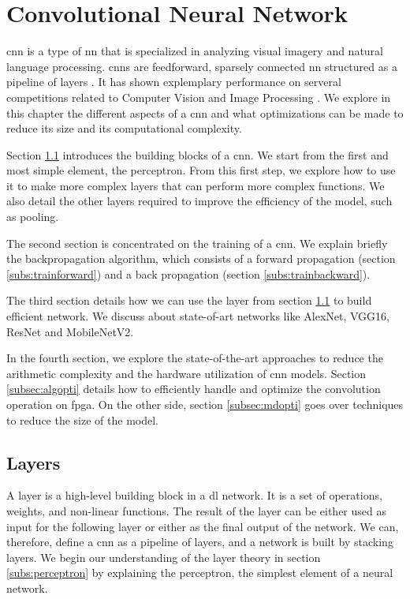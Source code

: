 \chapter{Convolutional Neural Network} \label{chap:cnn}
\acrfull{cnn} is a type of \acrlong{nn} that is specialized in analyzing visual imagery and natural language processing. \acrshort{cnn}s are feedforward, sparsely connected \acrshort{nn} structured as a pipeline of layers \cite{abdelouahab_accelerating_2018}. It has shown explemplary performance on serveral competitions related to Computer Vision and Image Processing \cite{khan_survey_2020}. We explore in this chapter the different aspects of a \acrshort{cnn} and what optimizations can be made to reduce its size and its computational complexity.

Section \ref{sec:layer} introduces the building blocks of a \acrshort{cnn}. We start from the first and most simple element, the perceptron. From this first step, we explore how to use it to make more complex layers that can perform more complex functions. We also detail the other layers required to improve the efficiency of the model, such as pooling.

The second section is concentrated on the training of a \acrshort{cnn}. We explain briefly the backpropagation algorithm, which consists of a forward propagation (section \ref{subs:trainforward}) and a back propagation (section \ref{subs:trainbackward}).

The third section details how we can use the layer from section \ref{sec:layer} to build efficient network. We discuss about state-of-art networks like AlexNet, VGG16, ResNet and MobileNetV2.

In the fourth section, we explore the state-of-the-art approaches to reduce the arithmetic complexity and the hardware utilization of \acrshort{cnn} models. Section \ref{subsec:algopti} details how to efficiently handle and optimize the convolution operation on \acrshort{fpga}. On the other side, section \ref{subsec:mdopti} goes over techniques to reduce the size of the model.
%
%
\section{Layers} \label{sec:layer}
A layer is a high-level building block in a \acrshort{dl} network. It is a set of operations, weights, and non-linear functions. The result of the layer can be either used as input for the following layer or either as the final output of the network. We can, therefore, define a \acrshort{cnn} as a pipeline of layers, and a network is built by stacking layers. We begin our understanding of the layer theory in section \ref{subs:perceptron} by explaining the perceptron, the simplest element of a neural network.
%
%

%

%

%

%

%

%
%
